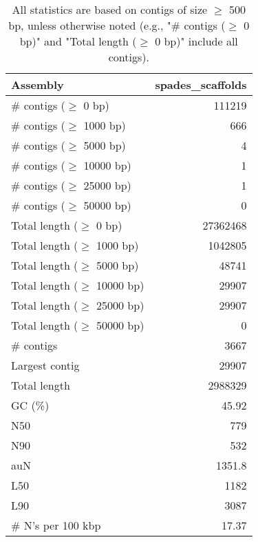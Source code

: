 \documentclass[12pt,a4paper]{article}
\begin{document}
\begin{table}[ht]
\begin{center}
\caption{All statistics are based on contigs of size $\geq$ 500 bp, unless otherwise noted (e.g., "\# contigs ($\geq$ 0 bp)" and "Total length ($\geq$ 0 bp)" include all contigs).}
\begin{tabular}{|l*{1}{|r}|}
\hline
Assembly & spades\_scaffolds \\ \hline
\# contigs ($\geq$ 0 bp) & 111219 \\ \hline
\# contigs ($\geq$ 1000 bp) & 666 \\ \hline
\# contigs ($\geq$ 5000 bp) & 4 \\ \hline
\# contigs ($\geq$ 10000 bp) & 1 \\ \hline
\# contigs ($\geq$ 25000 bp) & 1 \\ \hline
\# contigs ($\geq$ 50000 bp) & 0 \\ \hline
Total length ($\geq$ 0 bp) & 27362468 \\ \hline
Total length ($\geq$ 1000 bp) & 1042805 \\ \hline
Total length ($\geq$ 5000 bp) & 48741 \\ \hline
Total length ($\geq$ 10000 bp) & 29907 \\ \hline
Total length ($\geq$ 25000 bp) & 29907 \\ \hline
Total length ($\geq$ 50000 bp) & 0 \\ \hline
\# contigs & 3667 \\ \hline
Largest contig & 29907 \\ \hline
Total length & 2988329 \\ \hline
GC (\%) & 45.92 \\ \hline
N50 & 779 \\ \hline
N90 & 532 \\ \hline
auN & 1351.8 \\ \hline
L50 & 1182 \\ \hline
L90 & 3087 \\ \hline
\# N's per 100 kbp & 17.37 \\ \hline
\end{tabular}
\end{center}
\end{table}
\end{document}

